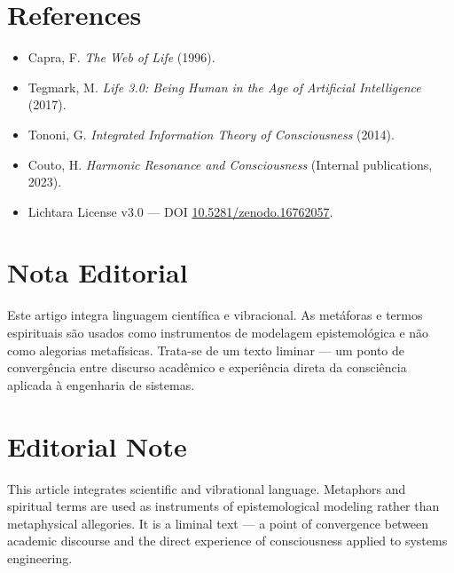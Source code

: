 \documentclass[12pt]{article}
\begin{document}
\begin{paracol}{2}
\section*{References}
\begin{itemize}[leftmargin=*]
\item Capra, F. \emph{The Web of Life} (1996).
\item Tegmark, M. \emph{Life 3.0: Being Human in the Age of Artificial Intelligence} (2017).
\item Tononi, G. \emph{Integrated Information Theory of Consciousness} (2014).
\item Couto, H. \emph{Harmonic Resonance and Consciousness} (Internal publications, 2023).
\item Lichtara License v3.0 --- DOI \href{https://doi.org/10.5281/zenodo.16762057}{10.5281/zenodo.16762057}.
\end{itemize}

\switchcolumn*

\section*{Nota Editorial}
Este artigo integra linguagem científica e vibracional. As metáforas e termos espirituais são usados como instrumentos de modelagem epistemológica e não como alegorias metafísicas. Trata-se de um texto liminar --- um ponto de convergência entre discurso acadêmico e experiência direta da consciência aplicada à engenharia de sistemas.

\switchcolumn

\section*{Editorial Note}
This article integrates scientific and vibrational language. Metaphors and spiritual terms are used as instruments of epistemological modeling rather than metaphysical allegories. It is a liminal text --- a point of convergence between academic discourse and the direct experience of consciousness applied to systems engineering.

\end{paracol}
\end{document}
